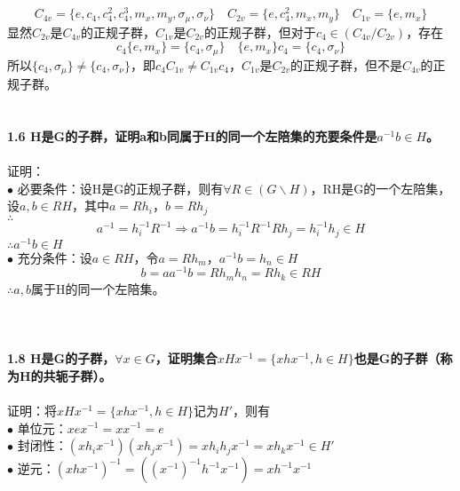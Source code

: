 \documentclass[12pt]{article}
\numberwithin{equation}{section}	 %
\begin{document}
\begin{spacing}{1.5}
\begin{equation}
C_{4v} = \{e,c_{4},c_{4}^{2},c_{4}^{3},m_{x},m_{y},\sigma_{\mu},\sigma_{\nu}\} \quad C_{2v} = \{e,c_{4}^{2},m_{x},m_{y}\} \quad C_{1v} = \{e,m_{x}\}
\end{equation}
显然$C_{2v}$是$C_{4v}$的正规子群，$C_{1v}$是$C_{2v}$的正规子群，但对于$c_{4} \in (C_{4v}/C_{2v})$，存在
\begin{equation}\nonumber 		%
c_{4}\{e,m_{x}\} = \{c_{4},\sigma_{\mu}\} \quad \{e,m_{x}\}c_{4} = \{c_{4},\sigma_{\nu}\}
\end{equation}
所以$\{c_{4},\sigma_{\mu}\} \ne \{c_{4},\sigma_{\nu}\}$，即$c_{4}C_{1v} \ne C_{1v}c_{4}$，$C_{1v}$是$C_{2v}$的正规子群，但不是$C_{4v}$的正规子群。
~\\
~\\
~\\
\textbf{1.6 \quad H是G的子群，证明a和b同属于H的同一个左陪集的充要条件是$a^{-1}b \in H$。}\\
~\\
证明：\\
$\bullet$ 必要条件：设H是G的正规子群，则有$\forall R \in (G \backslash H)$，RH是G的一个左陪集，设$a,b \in RH$，其中$a=Rh_{i}$，$b=Rh_{j}$ \\				 %
$\therefore$ 
\begin{equation}
a^{-1}=h_{i}^{-1}R^{-1} \Longrightarrow a^{-1}b=h_{i}^{-1}R^{-1}Rh_{j}=h_{i}^{-1}h_{j} \in H
\end{equation}
$\therefore a^{-1}b \in H$ \\
$\bullet$ 充分条件：设$a \in RH$，令$a=Rh_{m}$，$a^{-1}b = h_{n} \in H$ \\
\begin{equation}
b = aa^{-1}b = Rh_{m}h_{n} = Rh_{k} \in RH
\end{equation}
$\therefore a,b$属于H的同一个左陪集。\\
~\\
~\\
~\\
\textbf{1.8 \quad H是G的子群，$\forall x\in G$，证明集合$xHx^{-1}=\{ xhx^{-1}, h\in H\}$也是G的子群（称为H的共轭子群）。}\\		
~\\
证明：将$xHx^{-1}=\{ xhx^{-1}, h\in H\}$记为$H'$，则有\\
$\bullet$ 单位元：$xex^{-1}=xx^{-1}=e$ \\
$\bullet$ 封闭性：$(xh_{i}x^{-1})(xh_{j}x^{-1})=xh_{i}h_{j}x^{-1}=xh_{k}x^{-1} \in H'$ \\
$\bullet$ 逆元：$(xhx^{-1})^{-1}=((x^{-1})^{-1}h^{-1}x^{-1})=xh^{-1}x^{-1}$ \\

\end{spacing}
\end{document}
